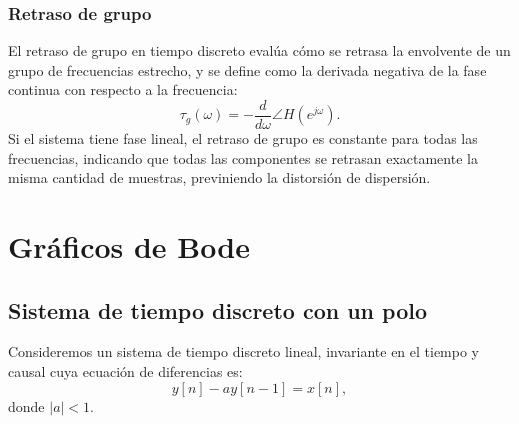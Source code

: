 \documentclass[11pt,a4paper,openany]{book}
\begin{document}
\subsubsection{Retraso de grupo}

El retraso de grupo en tiempo discreto evalúa cómo se retrasa la envolvente de un grupo de frecuencias estrecho, y se define como la derivada negativa de la fase continua con respecto a la frecuencia:
\begin{equation}
	\tau_g(\omega) = -\frac{d}{d\omega} \angle H(e^{j\omega}).
\end{equation}
Si el sistema tiene fase lineal, el retraso de grupo es constante para todas las frecuencias, indicando que todas las componentes se retrasan exactamente la misma cantidad de muestras, previniendo la distorsión de dispersión.

\section{Gr\'{a}ficos de Bode}

\subsection{Sistema de tiempo discreto con un polo}

Consideremos un sistema de tiempo discreto lineal, invariante en el tiempo y causal cuya ecuaci\'{o}n de diferencias es:
\begin{equation}
	y[n] - a y[n-1] = x[n],
\end{equation}
donde $|a| < 1$.
\end{document}
